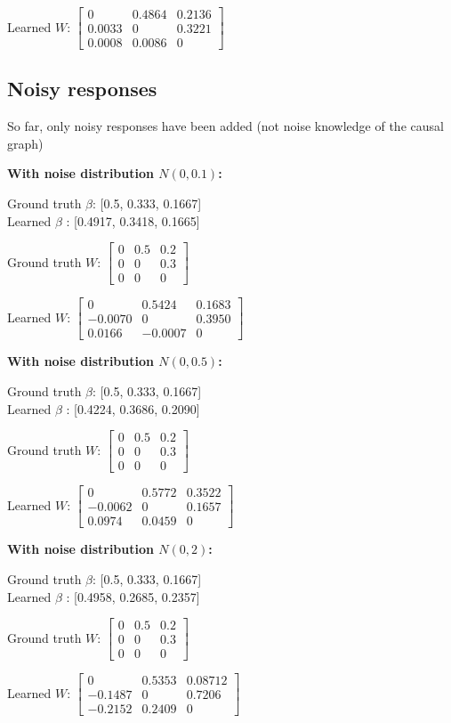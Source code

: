 Learned $W$: $\begin{bmatrix}
	0 & 0.4864 & 0.2136 \\
	0.0033 & 0 & 0.3221 \\
	0.0008 & 0.0086 & 0
\end{bmatrix}$



\subsection{Noisy responses}

So far, only noisy responses have been added (not noise knowledge of the causal graph)

\textbf{With noise distribution $N(0, 0.1)$:}

Ground truth $\beta$: [0.5, 0.333, 0.1667] \\
Learned $\beta$ : [0.4917, 0.3418, 0.1665]

Ground truth $W$: $\begin{bmatrix}
	0 & 0.5 & 0.2 \\
	0 & 0 & 0.3 \\
	0 & 0 & 0
\end{bmatrix}$

Learned $W$: $\begin{bmatrix}
	0 & 0.5424 & 0.1683 \\
	-0.0070 & 0 & 0.3950 \\
	0.0166 & -0.0007 & 0
\end{bmatrix}$


\textbf{With noise distribution $N(0, 0.5)$:}

Ground truth $\beta$: [0.5, 0.333, 0.1667] \\
Learned $\beta$ : [0.4224, 0.3686, 0.2090]

Ground truth $W$: $\begin{bmatrix}
	0 & 0.5 & 0.2 \\
	0 & 0 & 0.3 \\
	0 & 0 & 0
\end{bmatrix}$

Learned $W$: $\begin{bmatrix}
	0 & 0.5772 & 0.3522 \\
	-0.0062 & 0 & 0.1657 \\
	0.0974 & 0.0459 & 0
\end{bmatrix}$

\textbf{With noise distribution $N(0, 2)$:}

Ground truth $\beta$: [0.5, 0.333, 0.1667] \\
Learned $\beta$ : [0.4958, 0.2685, 0.2357]

Ground truth $W$: $\begin{bmatrix}
	0 & 0.5 & 0.2 \\
	0 & 0 & 0.3 \\
	0 & 0 & 0
\end{bmatrix}$

Learned $W$: $\begin{bmatrix}
	0 & 0.5353 & 0.08712 \\
	-0.1487 & 0 & 0.7206 \\
	-0.2152 & 0.2409 & 0
\end{bmatrix}$